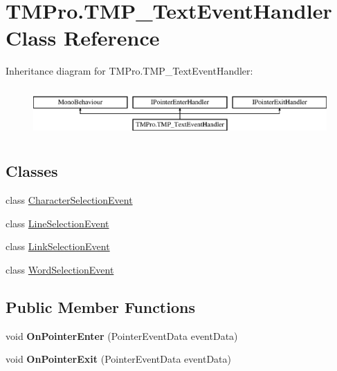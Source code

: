 \hypertarget{class_t_m_pro_1_1_t_m_p___text_event_handler}{}\section{T\+M\+Pro.\+T\+M\+P\+\_\+\+Text\+Event\+Handler Class Reference}
\label{class_t_m_pro_1_1_t_m_p___text_event_handler}
Inheritance diagram for T\+M\+Pro.\+T\+M\+P\+\_\+\+Text\+Event\+Handler\+:\begin{figure}[H]
\begin{center}
\leavevmode
\includegraphics[height=1.914530cm]{class_t_m_pro_1_1_t_m_p___text_event_handler}
\end{center}
\end{figure}
\subsection*{Classes}
\begin{DoxyCompactItemize}
\item 
class \hyperlink{class_t_m_pro_1_1_t_m_p___text_event_handler_1_1_character_selection_event}{Character\+Selection\+Event}
\item 
class \hyperlink{class_t_m_pro_1_1_t_m_p___text_event_handler_1_1_line_selection_event}{Line\+Selection\+Event}
\item 
class \hyperlink{class_t_m_pro_1_1_t_m_p___text_event_handler_1_1_link_selection_event}{Link\+Selection\+Event}
\item 
class \hyperlink{class_t_m_pro_1_1_t_m_p___text_event_handler_1_1_word_selection_event}{Word\+Selection\+Event}
\end{DoxyCompactItemize}
\subsection*{Public Member Functions}
\begin{DoxyCompactItemize}
\item 
\mbox{\label{class_t_m_pro_1_1_t_m_p___text_event_handler_a2aabc4e44e30d86b783edb3d4a2f2d9b}} 
void {\bfseries On\+Pointer\+Enter} (Pointer\+Event\+Data event\+Data)
\item 
\mbox{\label{class_t_m_pro_1_1_t_m_p___text_event_handler_a0ad3fd5e712593130a9669706aa55906}} 
void {\bfseries On\+Pointer\+Exit} (Pointer\+Event\+Data event\+Data)
\end{DoxyCompactItemize}
